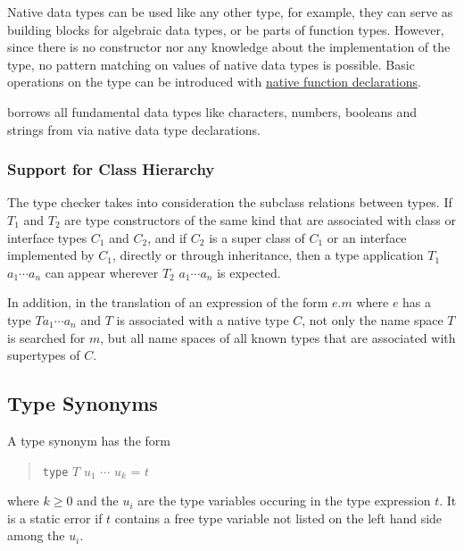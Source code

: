 Native data types can be used like any other type, for example, they can serve as building blocks for algebraic data types, or be parts of function types. However, since there is no constructor nor any knowledge about the implementation of the type, no pattern matching on values of native data types is possible. Basic operations on the type can be introduced with \hyperref[nativefun]{native function declarations}.

\frege{} borrows all fundamental data types like characters, numbers, booleans and strings from \java{} via native data type declarations. 

\subsubsection{Support for \java{} Class Hierarchy} \label{polymorphism}

The \frege{} type checker takes into consideration the subclass relations between \java{} types. If $T_1$ and $T_2$ are type constructors of the same kind that are associated with \java{} class or interface types $C_1$ and $C_2$, and if $C_2$ is a super class of $C_1$ or an interface implemented by $C_1$, directly or through inheritance, then a type application $T_1$ $a_1 \cdots{} a_n$ can appear wherever $T_2$ $a_1 \cdots{} a_n$ is expected.

In addition, in the translation of an expression of the form $e.m$ where $e$ has a type $T a_1 \cdots{} a_n$ and $T$ is associated with a native type $C$, not only the name space $T$ is searched for $m$, but all name spaces of all known types that are associated with supertypes of $C$.

\subsection{Type Synonyms} \label{typedcl} 

\begin{flushleft}
    \sym{=} 
\end{flushleft}

A type synonym has the form
\begin{quote}
\texttt{type} $T$ $u_1$ $\cdots$ $u_k$ = $t$
\end{quote}
where $k\ge 0$ and the $u_i$ are the type variables occuring in the type expression $t$. It is a static error if $t$ contains a free type variable not listed on the left hand side among the $u_i$. 

